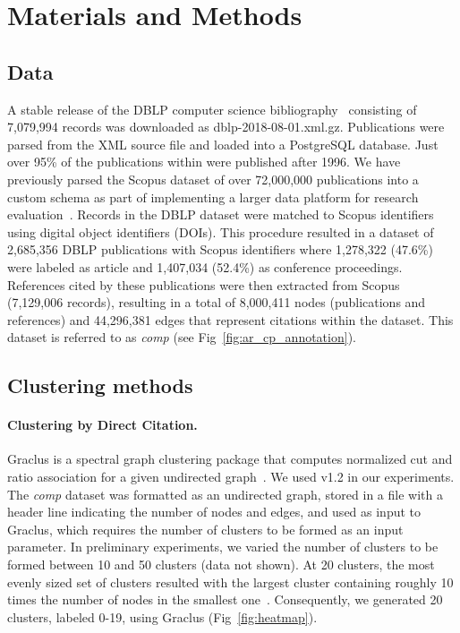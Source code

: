 \section{Materials and Methods}
\label{sec:methods}

\subsection{Data}
 A stable release of the DBLP computer science bibliography~\cite{dblp_ref} consisting of 7,079,994 records was downloaded as dblp-2018-08-01.xml.gz. Publications were parsed from the XML source file and loaded into a PostgreSQL database. Just over 95\% of the publications within were published after 1996. We have previously parsed the Scopus dataset of over 72,000,000 publications into a custom schema as part of implementing a larger data platform for research evaluation~\cite{GithubERNIE2019}. Records in the DBLP dataset were matched to Scopus identifiers using digital object identifiers (DOIs). This procedure resulted in a dataset of 2,685,356 DBLP publications with Scopus identifiers where 1,278,322 (47.6\%) were labeled as article and 1,407,034 (52.4\%) as conference proceedings. References cited by these publications were then extracted from Scopus (7,129,006 records), resulting in a total of 8,000,411 nodes (publications and references) and 44,296,381 edges that represent citations within the dataset. This dataset is referred to as \emph{comp} (see Fig~\ref{fig:ar_cp_annotation}).
 
\subsection{Clustering methods}

\paragraph{Clustering by Direct Citation.} Graclus is a spectral graph clustering package that computes normalized cut and ratio association for a given undirected graph~\cite{graclus_2007}.  We used v1.2 in our experiments. The \emph{comp} dataset was formatted as an undirected graph, stored in a file with a header line indicating the number of nodes and edges, and used as input to Graclus, which requires the number of clusters to be formed as an input parameter. In preliminary experiments, we varied the number of clusters to be formed between 10 and 50 clusters (data not shown).  At 20 clusters, the most evenly sized set of clusters resulted with the largest cluster containing roughly 10 times the number of nodes in the smallest one~\cite{traag_louvain_2019}.  Consequently, we generated 20 clusters, labeled 0-19, using Graclus (Fig~\ref{fig:heatmap}).

